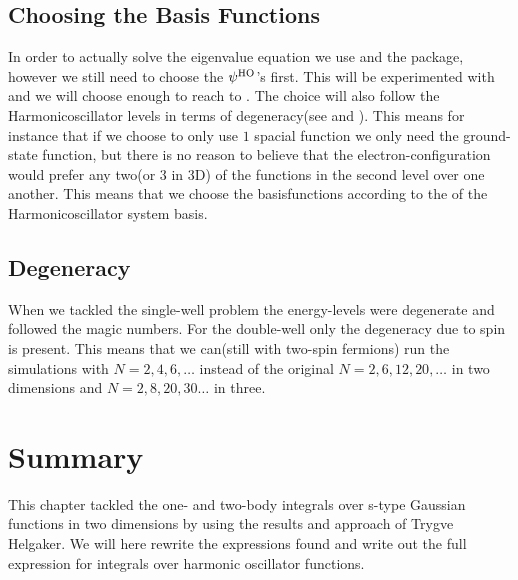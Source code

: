 \subsection{Choosing the Basis Functions}
    In order to actually solve the eigenvalue equation we use  and
    the  package, however we still need to choose the $\psi^{\text{HO}}$'s
    first. This will be experimented with and we will choose enough to reach to
    . The choice will also follow the
    Harmonicoscillator levels in terms of degeneracy(see  and
    ). This means for instance that if we choose to only use $1$
    spacial function we only need the ground-state function, but there is no
    reason to believe that the electron-configuration would prefer any two(or
    $3$ in 3D) of the functions in the second level over one another. This
    means that we choose the basisfunctions according to the  of the Harmonicoscillator system basis.

\subsection{Degeneracy}
    When we tackled the single-well problem the energy-levels were degenerate
    and followed the magic numbers. For the double-well only the degeneracy due
    to spin is present. This means that we can(still with two-spin fermions)
    run the simulations with $N=2,4,6,\dots$ instead of the original
    $N=2,6,12,20,\dots$ in two dimensions and $N=2,8,20,30\dots$ in three.

\section{Summary\label{sec:basis_summary}}
    This chapter tackled the one- and two-body integrals over s-type Gaussian
    functions in two dimensions by using the results and approach of Trygve
    Helgaker. We will here rewrite the expressions found and write out the full
    expression for integrals over harmonic oscillator functions. \\

